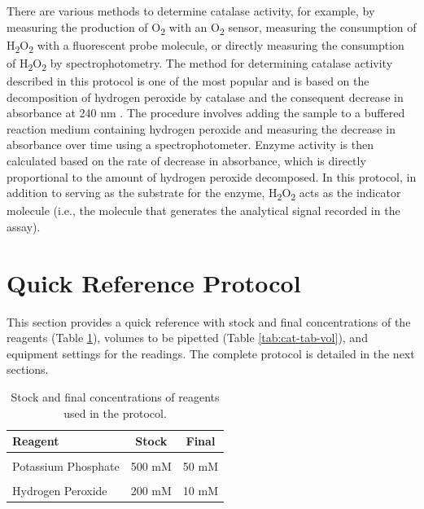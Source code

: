 \documentclass[
  9pt,
  american,
  a5paper,
  extrafontsizes,onecolumn,openright
  ]{memoir}
\begin{document}
There are various methods to determine catalase activity, for example, by measuring the production of O\textsubscript{2} with an O\textsubscript{2} sensor, measuring the consumption of H\textsubscript{2}O\textsubscript{2} with a fluorescent probe molecule, or directly measuring the consumption of H\textsubscript{2}O\textsubscript{2} by spectrophotometry. The method for determining catalase activity described in this protocol is one of the most popular and is based on the decomposition of hydrogen peroxide by catalase and the consequent decrease in absorbance at 240 nm \autocite{aebi_catalase_1984}. The procedure involves adding the sample to a buffered reaction medium containing hydrogen peroxide and measuring the decrease in absorbance over time using a spectrophotometer. Enzyme activity is then calculated based on the rate of decrease in absorbance, which is directly proportional to the amount of hydrogen peroxide decomposed. In this protocol, in addition to serving as the substrate for the enzyme, H\textsubscript{2}O\textsubscript{2} acts as the indicator molecule (i.e., the molecule that generates the analytical signal recorded in the assay).

\newpage

\section{Quick Reference Protocol}\label{cat-quick-ref}

This section provides a quick reference with stock and final concentrations of the reagents (Table \ref{tab:cat-tab-conc}), volumes to be pipetted (Table \ref{tab:cat-tab-vol}), and equipment settings for the readings. The complete protocol is detailed in the next sections.





\scriptsize

\begin{table}[!h]
\centering
\caption{\label{tab:cat-tab-conc}Stock and final concentrations of reagents used in the protocol.}
\centering
\begin{tabular}[t]{lcc}
\toprule
\textbf{Reagent} & \textbf{Stock} & \textbf{Final}\\
\midrule
\cellcolor{gray!10}{Phosphate Buffer + EDTA (pH 7.2)} & \cellcolor{gray!10}{} & \cellcolor{gray!10}{}\\
\hspace{1em}Potassium Phosphate & 500 mM & 50 mM\\
\cellcolor{gray!10}{\hspace{1em}EDTA} & \cellcolor{gray!10}{5 mM} & \cellcolor{gray!10}{0.5 mM}\\
Hydrogen Peroxide & 200 mM & 10 mM\\
\bottomrule
\end{tabular}
\end{table}
\end{document}
